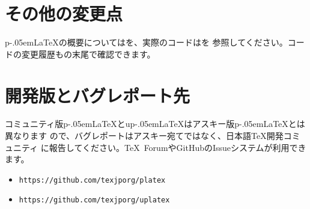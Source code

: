 \documentclass{plnews}
\def\pLaTeX{p\kern-.05em\LaTeX}
\begin{document}
\section{その他の変更点}
\pLaTeX{}の概要についてはを、実際のコードはを
参照してください。コードの変更履歴もの末尾で確認できます。


\section{開発版とバグレポート先}
コミュニティ版\pLaTeX{}とu\pLaTeX{}はアスキー版\pLaTeX{}とは異なります
ので、バグレポートはアスキー宛てではなく、日本語\TeX{}開発コミュニティ
に報告してください。\TeX\ ForumやGitHubのIssueシステムが利用できます。
\begin{itemize}
\item \texttt{https://github.com/texjporg/platex}
\item \texttt{https://github.com/texjporg/uplatex}
\end{itemize}
\end{document}
